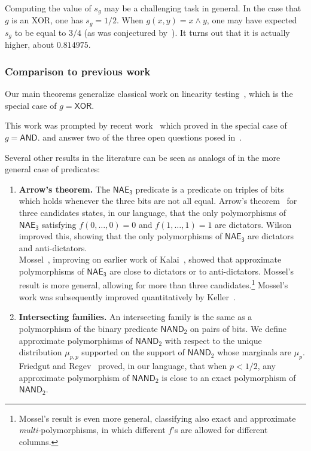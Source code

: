 \documentclass{article}
\theoremstyle{definition}
\theoremstyle{remark}
\begin{document}
Computing the value of $s_g$ may be a challenging task in general. 
In the case that $g$ is an XOR, one has $s_g = 1/2$. When $g(x,y) = x\land y$, 
one may have expected $s_g$ to be equal to $3/4$ (as was conjectured by~\cite{FLMM2020}). It turns out that it is actually higher, about $0.814975$.

\subsubsection{Comparison to previous work}

Our main theorems generalize classical work on linearity testing~\cite{BLR,Bellare}, which is the special case of $g = \mathsf{XOR}$.

This work was prompted by recent work~\cite{FLMM2020} which proved  in the special case of $g = \mathsf{AND}$.
 and  answer two of the three open questions posed in~\cite{FLMM2020}.

Several other results in the literature can be seen as analogs of  in the more general case of predicates:
\begin{enumerate}
    \item \textbf{Arrow's theorem.} The $\mathsf{NAE_3}$ predicate is a predicate on triples of bits which holds whenever the three bits are not all equal.
    Arrow's theorem~\cite{Arrow} for three candidates states, in our language, that the only polymorphisms of $\mathsf{NAE_3}$ satisfying $f(0,\ldots,0) = 0$ and $f(1,\ldots,1) = 1$ are dictators. Wilson~\cite{Wilson} improved this, showing that the only polymorphisms of $\mathsf{NAE_3}$ are dictators and anti-dictators.
    \\
    Mossel~\cite{Mossel2012}, improving on earlier work of Kalai~\cite{Kalai}, showed that approximate polymorphisms of $\mathsf{NAE_3}$ are close to dictators or to anti-dictators.
    Mossel's result is more general, allowing for more than three candidates.\footnote{Mossel's result is even more general, classifying also exact and approximate \emph{multi-}polymorphisms, in which different $f$'s are allowed for different columns.}
    Mossel's work was subsequently improved quantitatively by Keller~\cite{Keller}.
    \item \textbf{Intersecting families.} An intersecting family is the same as a polymorphism of the binary predicate $\mathsf{NAND_2}$ on pairs of bits.
    We define approximate polymorphisms of $\mathsf{NAND_2}$ with respect to the unique distribution $\mu_{p,p}$ supported on the support of $\mathsf{NAND}_2$ whose marginals are $\mu_p$. \\ Friedgut and Regev~\cite{FriedgutRegev} proved, in our language, that when $p < 1/2$, any approximate polymorphism of $\mathsf{NAND_2}$ is close to an exact polymorphism of $\mathsf{NAND_2}$.
\end{enumerate}
\end{document}
